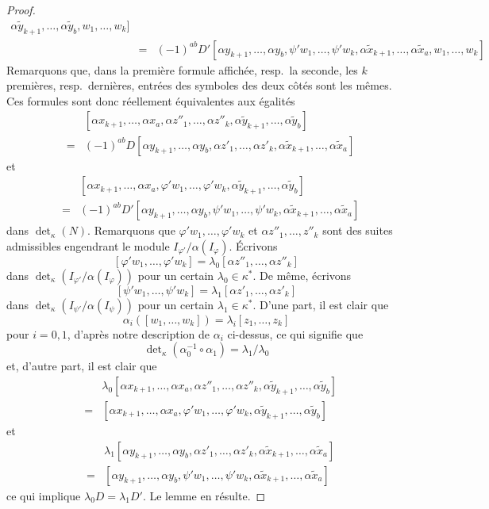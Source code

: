 \begin{proof}
\begin{eqnarray*}
\alpha \tilde y_{k + 1}, \ldots, \alpha \tilde y_b,
w_1, \ldots, w_k]
\\
& = &
(-1)^{ab} D'
[\alpha y_{k + 1}, \ldots, \alpha y_b,
\psi' w_1, \ldots, \psi' w_k,
\alpha \tilde x_{k + 1}, \ldots, \alpha \tilde x_a,
w_1, \ldots, w_k]
\end{eqnarray*}
Remarquons que, dans la première formule affichée, resp.\ la seconde,
les $k$ premières, resp.\ dernières, entrées des symboles des deux côtés
sont les mêmes. Ces formules sont donc réellement équivalentes aux
égalités
\begin{eqnarray*}
& &
[\alpha x_{k + 1}, \ldots, \alpha x_a,
\alpha z''_1, \ldots, \alpha z''_k,
\alpha \tilde y_{k + 1}, \ldots, \alpha \tilde y_b] \\
& = &
(-1)^{ab} D
[\alpha y_{k + 1}, \ldots, \alpha y_b,
\alpha z'_1, \ldots, \alpha z'_k,
\alpha \tilde x_{k + 1}, \ldots, \alpha \tilde x_a]
\end{eqnarray*}
et
\begin{eqnarray*}
& &
[\alpha x_{k + 1}, \ldots, \alpha x_a,
\varphi' w_1, \ldots, \varphi' w_k,
\alpha \tilde y_{k + 1}, \ldots, \alpha \tilde y_b]
\\
& = &
(-1)^{ab} D'
[\alpha y_{k + 1}, \ldots, \alpha y_b,
\psi' w_1, \ldots, \psi' w_k,
\alpha \tilde x_{k + 1}, \ldots, \alpha \tilde x_a]
\end{eqnarray*}
dans $\det_\kappa(N)$. Remarquons que
$\varphi' w_1, \ldots, \varphi' w_k$
et
$\alpha z''_1, \ldots, z''_k$
sont des suites admissibles engendrant le module
$I_{\varphi'}/\alpha(I_\varphi)$. Écrivons
$$
[\varphi' w_1, \ldots, \varphi' w_k]
= \lambda_0 [\alpha z''_1, \ldots, \alpha z''_k]
$$
dans $\det_\kappa(I_{\varphi'}/\alpha(I_\varphi))$
pour un certain $\lambda_0 \in \kappa^*$. De même,
écrivons
$$
[\psi' w_1, \ldots, \psi' w_k]
= \lambda_1 [\alpha z'_1, \ldots, \alpha z'_k]
$$
dans $\det_\kappa(I_{\psi'}/\alpha(I_\psi))$
pour un certain $\lambda_1 \in \kappa^*$. D'une part,
il est clair que
$$
\alpha_i([w_1, \ldots, w_k]) = \lambda_i[z_1, \ldots, z_k]
$$
pour $i = 0, 1$, d'après notre description de $\alpha_i$ ci-dessus,
ce qui signifie que
$$
\det\nolimits_\kappa(\alpha_0^{-1} \circ \alpha_1)
=
\lambda_1/\lambda_0
$$
et,
d'autre part, il est clair que
\begin{eqnarray*}
& &
\lambda_0 [\alpha x_{k + 1}, \ldots, \alpha x_a,
\alpha z''_1, \ldots, \alpha z''_k,
\alpha \tilde y_{k + 1}, \ldots, \alpha \tilde y_b] \\
& = &
[\alpha x_{k + 1}, \ldots, \alpha x_a,
\varphi' w_1, \ldots, \varphi' w_k,
\alpha \tilde y_{k + 1}, \ldots, \alpha \tilde y_b]
\end{eqnarray*}
et
\begin{eqnarray*}
& &
\lambda_1[\alpha y_{k + 1}, \ldots, \alpha y_b,
\alpha z'_1, \ldots, \alpha z'_k,
\alpha \tilde x_{k + 1}, \ldots, \alpha \tilde x_a] \\
& = &
[\alpha y_{k + 1}, \ldots, \alpha y_b,
\psi' w_1, \ldots, \psi' w_k,
\alpha \tilde x_{k + 1}, \ldots, \alpha \tilde x_a]
\end{eqnarray*}
ce qui implique $\lambda_0 D = \lambda_1 D'$. Le lemme en résulte.
\end{proof}
